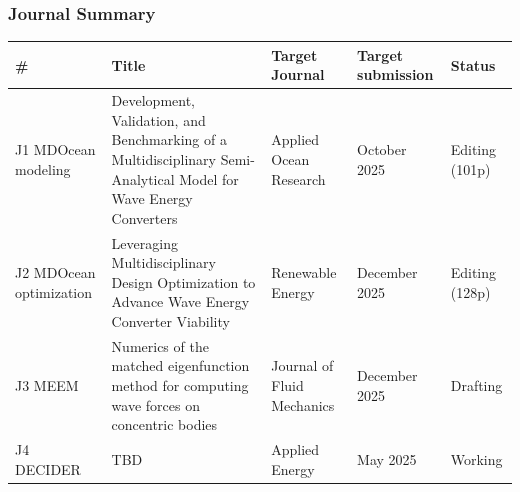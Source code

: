 \begin{frame}
	\frametitle{Journal Summary}
	\begin{tabular}{|l|l|l|l|l|} \hline
		#                       & Title                                                                                                             & Target Journal             & Target submission & Status         \\ \hline
		J1 MDOcean modeling     & Development, Validation, and Benchmarking of a Multidisciplinary Semi-Analytical Model for Wave Energy Converters & Applied Ocean Research     & October 2025      & Editing (101p) \\ \hline
		J2 MDOcean optimization & Leveraging Multidisciplinary Design Optimization to Advance Wave Energy Converter Viability                       & Renewable Energy           & December 2025     & Editing (128p) \\ \hline
		J3 MEEM                 & Numerics of the matched eigenfunction method for computing wave forces on concentric bodies                       & Journal of Fluid Mechanics & December 2025     & Drafting       \\ \hline
		J4 DECIDER              & TBD                                                                                                               & Applied Energy             & May 2025          & Working        \\ \hline
	\end{tabular}
	
	
\end{frame}


